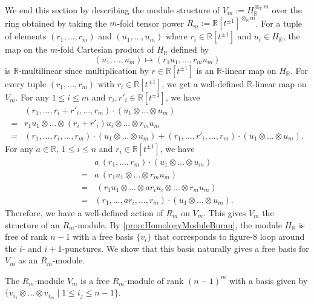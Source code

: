 \documentclass{amsart}
\begin{document}
We end this section by describing the module structure of $V_m := H_{\mathbb{R}}^{\otimes_\mathbb{R} m}$ over the ring obtained by taking the $m$-fold tensor power $R_m := \mathbb{R}[t^{\pm 1}]^{\otimes_\mathbb{R} m}$. For a tuple of elements $(r_1,\dots,r_m)$ and $(u_1,\dots,u_m)$ where $r_i \in \mathbb{R}[t^{\pm 1}]$ and $u_i \in H_\mathbb{R}$, the map on the $m$-fold Cartesian product of $H_\mathbb{R}$ defined by
\[
(u_1,\dots,u_m) \mapsto (r_1u_1,\dots,r_mu_m)
\]
is $\mathbb{R}$-multilinear since multiplication by $r \in \mathbb{R}[t^{\pm 1}]$ is an $\mathbb{R}$-linear map on $H_\mathbb{R}$. For every tuple $(r_1,\dots,r_m)$ with $r_i \in \mathbb{R}[t^{\pm 1}]$, we get a well-defined $\mathbb{R}$-linear map on $V_m$. For any $1 \leq i \leq m$ and $r_i, r'_i \in \mathbb{R}[t^{\pm 1}]$, we have
\begin{align*}
    &(r_1,\dots,r_i + r'_i, \dots, r_m) \cdot (u_1 \otimes \dots \otimes u_m) \\ 
    = &r_1 u_1 \otimes \dots \otimes(r_i + r'_i) u_i \otimes \dots \otimes r_m u_m \\ 
    = &(r_1,\dots,r_i, \dots, r_m)\cdot (u_1 \otimes \dots \otimes u_m) + (r_1,\dots,r'_i, \dots, r_m)  \cdot (u_1 \otimes \dots \otimes u_m). 
\end{align*}
For any $a \in \mathbb{R}$, $1 \leq i \leq n$ and $r_i \in \mathbb{R}[t^{\pm 1}]$, we have
\begin{align*}
    &a \ (r_1,\dots,r_m)\cdot  (u_1 \otimes \dots \otimes u_m) \\
    = &a \ (r_1u_1 \otimes \dots \otimes r_m u_m )\\
    = & \ (r_1u_1 \otimes \dots \otimes ar_i u_i \otimes \dots \otimes r_m u_m )\\
    = & (r_1,\dots,ar_i,\dots,r_m)\cdot (u_1 \otimes \dots \otimes u_m). 
\end{align*}
Therefore, we have a well-defined action of $R_m$ on $V_m$. This gives $V_m$ the structure of an $R_m$-module. By \cref{prop:HomologyModuleBurau}, the module $H_\mathbb{R}$ is free of rank $n-1$ with a free basis $\{v_i\}$ that corresponds to figure-8 loop around the $i$- and $i+1$-punctures. We show that this basis naturally gives a free basis for $V_m$ as an $R_m$-module.  

\begin{prop}
\label{prop:TensorPowerOfHomologyModuleIsFree}
    The $R_m$-module $V_m$ is a free $R_m$-module of rank $(n-1)^m$ with a basis given by $\{v_{i_1}\otimes \dots \otimes v_{i_m} \mid 1 \leq i_j \leq n-1 \}$. 
\end{prop}
\end{document}
